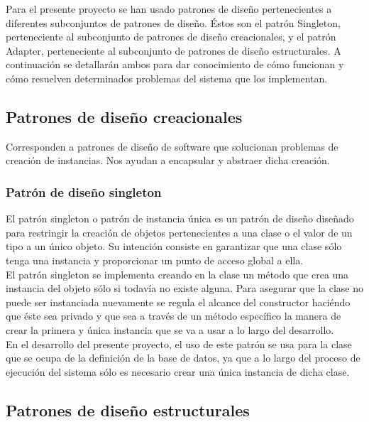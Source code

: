 Para el presente proyecto se han usado patrones de diseño pertenecientes a diferentes subconjuntos de patrones de diseño. Éstos son el patrón Singleton, perteneciente al subconjunto de patrones de diseño creacionales, y el patrón Adapter, perteneciente al subconjunto de patrones de diseño estructurales. A continuación se detallarán ambos para dar conocimiento de cómo funcionan y cómo resuelven determinados problemas del sistema que los implementan.

\subsection{Patrones de diseño creacionales}

Corresponden a patrones de diseño de software que solucionan problemas de creación de instancias. Nos ayudan a encapsular y abstraer dicha creación.

\subsubsection{Patrón de diseño singleton}

El patrón singleton o patrón de instancia única es un patrón de diseño diseñado para restringir la creación de objetos pertenecientes a una clase o el valor de un tipo a un único objeto. Su intención consiste en garantizar que una clase sólo tenga una instancia y proporcionar un punto de acceso global a ella.\\

El patrón singleton se implementa creando en la clase un método que crea una instancia del objeto sólo si todavía no existe alguna. Para asegurar que la clase no puede ser instanciada nuevamente se regula el alcance del constructor haciéndo que éste sea privado y que sea a través de un método específico la manera de crear la primera y única instancia que se va a usar a lo largo del desarrollo.\\

En el desarrollo del presente proyecto, el uso de este patrón se usa para la clase que se ocupa de la definición de la base de datos, ya que a lo largo del proceso de ejecución del sistema sólo es necesario crear una única instancia de dicha clase.\\

\subsection{Patrones de diseño estructurales}

